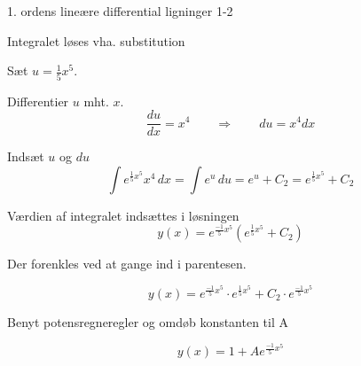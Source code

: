 \documentclass{article}
\begin{document}
\begin{exercise}{1. ordens lineære differential ligninger 1-2}
	\hint
	
	Integralet løses vha. substitution
	
	
	\hint
	Sæt $u = \frac{1}{5}x^5$.
	
	\hint
	
	Differentier $u$ mht. $x$.
	\[
	\frac{du}{dx} = x^4 \qquad	\Rightarrow \qquad du = x^4 dx
	\]
	
	\hint 
	Indsæt $u$ og $du$
	\[
	\int e^{\frac{1}{5}x^5}x^4 \, dx = \int e^{u} \, du = e^{u} + C_2 = e^{\frac{1}{5}x^5} + C_2
	\]
	
	\hint
	
	Værdien af integralet indsættes i løsningen
	\[
	y(x) = e^{\frac{-1}{5}x^5} \left( e^{\frac{1}{5}x^5}+ C_2\right)
	\]
	
	\hint
	
	Der forenkles ved at gange ind i parentesen.
	
	\hint
	\[
	y(x) = e^{\frac{-1}{5}x^5} \cdot e^{\frac{1}{5}x^5} + C_2 \cdot e^{\frac{-1}{5}x^5} 
	\]
	
	\hint
	
	Benyt potensregneregler og omdøb konstanten til A
	
	\hint
	\[
	y(x) = 1 + A e^{\frac{-1}{5}x^5}
	\]
	
	
\end{exercise}

\newpage
\end{document}

